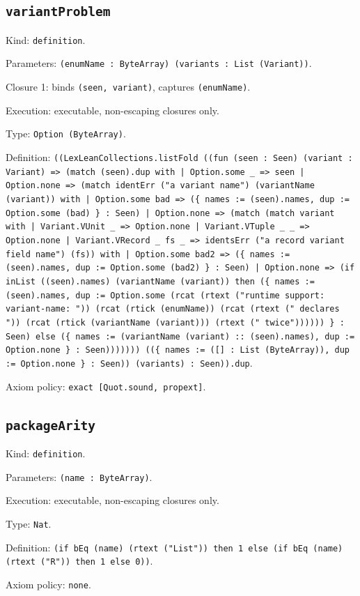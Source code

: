 \documentclass[11pt]{article}
\begin{document}
\subsection*{\texttt{variantProblem}}
\noindent Kind: \texttt{definition}.\par
\noindent Parameters: \texttt{(enumName : ByteArray) (variants : List (Variant))}.\par
\noindent Closure 1: binds \texttt{(seen, variant)}, captures \texttt{(enumName)}.\par
\noindent Execution: executable, non-escaping closures only.\par
\noindent Type: \texttt{Option (ByteArray)}.\par
\noindent Definition: \texttt{((LexLeanCollections.listFold ((fun (seen : Seen) (variant : Variant) => (match (seen).dup with | Option.some \_ => seen | Option.none => (match identErr ("a variant name") (variantName (variant)) with | Option.some bad => (\{ names := (seen).names, dup := Option.some (bad) \} : Seen) | Option.none => (match (match variant with | Variant.VUnit \_ => Option.none | Variant.VTuple \_ \_ => Option.none | Variant.VRecord \_ fs \_ => identsErr ("a record variant field name") (fs)) with | Option.some bad2 => (\{ names := (seen).names, dup := Option.some (bad2) \} : Seen) | Option.none => (if inList ((seen).names) (variantName (variant)) then (\{ names := (seen).names, dup := Option.some (rcat (rtext ("runtime support: variant-name: ")) (rcat (rtick (enumName)) (rcat (rtext (" declares ")) (rcat (rtick (variantName (variant))) (rtext (" twice")))))) \} : Seen) else (\{ names := (variantName (variant) :: (seen).names), dup := Option.none \} : Seen))))))) ((\{ names := ([] : List (ByteArray)), dup := Option.none \} : Seen)) (variants) : Seen)).dup}.\par
\noindent Axiom policy: \texttt{exact [Quot.sound, propext]}.\par
\subsection*{\texttt{packageArity}}
\noindent Kind: \texttt{definition}.\par
\noindent Parameters: \texttt{(name : ByteArray)}.\par
\noindent Execution: executable, non-escaping closures only.\par
\noindent Type: \texttt{Nat}.\par
\noindent Definition: \texttt{(if bEq (name) (rtext ("List")) then 1 else (if bEq (name) (rtext ("R")) then 1 else 0))}.\par
\noindent Axiom policy: \texttt{none}.\par
\end{document}
